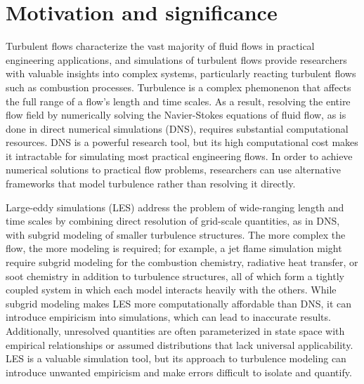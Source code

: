 \documentclass[preprint,12pt, a4paper]{elsarticle}
\begin{document}

\section{Motivation and significance}
\label{sec:motivation}

Turbulent flows characterize the vast majority of fluid flows in practical engineering applications, and simulations of turbulent flows provide researchers with valuable insights into complex systems, particularly reacting turbulent flows such as combustion processes. Turbulence is a complex phemonenon that affects the full range of a flow's length and time scales. As a result, resolving the entire flow field by numerically solving the Navier-Stokes equations of fluid flow, as is done in direct numerical simulations (DNS), requires substantial computational resources. DNS is a powerful research tool, but its high computational cost makes it intractable for simulating most practical engineering flows. In order to achieve numerical solutions to practical flow problems, researchers can use alternative frameworks that model turbulence rather than resolving it directly.

Large-eddy simulations (LES) address the problem of wide-ranging length and time scales by combining  direct resolution of grid-scale quantities, as in DNS, with subgrid modeling of smaller turbulence structures. The more complex the flow, the more modeling is required; for example, a jet flame simulation might require subgrid modeling for the combustion chemistry, radiative heat transfer, or soot chemistry in addition to turbulence structures, all of which form a tightly coupled system in which each model interacts heavily with the others. While subgrid modeling makes LES more computationally affordable than DNS, it can introduce empiricism into simulations, which can lead to inaccurate results. Additionally, unresolved quantities are often parameterized in state space with empirical relationships or assumed distributions that lack universal applicability. LES is a valuable simulation tool, but its approach to turbulence modeling can introduce unwanted empiricism and make errors difficult to isolate and quantify.
\end{document}
